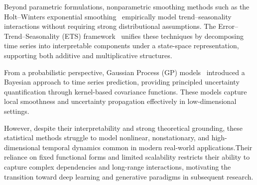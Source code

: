 Beyond parametric formulations, nonparametric smoothing methods such as the Holt–Winters exponential smoothing~\cite{KOEHLER2001269} empirically model trend–seasonality interactions without requiring strong distributional assumptions. The Error–Trend–Seasonality (ETS) framework~\cite{RePEc2009} unifies these techniques by decomposing time series into interpretable components under a state-space representation, supporting both additive and multiplicative structures.

From a probabilistic perspective, Gaussian Process (GP) models~\cite{2005Gaussian} introduced a Bayesian approach to time series prediction, providing principled uncertainty quantification through kernel-based covariance functions. These models capture local smoothness and uncertainty propagation effectively in low-dimensional settings.

	
	

However, despite their interpretability and strong theoretical grounding, these statistical methods struggle to model nonlinear, nonstationary, and high-dimensional temporal dynamics common in modern real-world applications.Their reliance on fixed functional forms and limited scalability restricts their ability to capture complex dependencies and long-range interactions, motivating the transition toward deep learning and generative paradigms in subsequent research.


